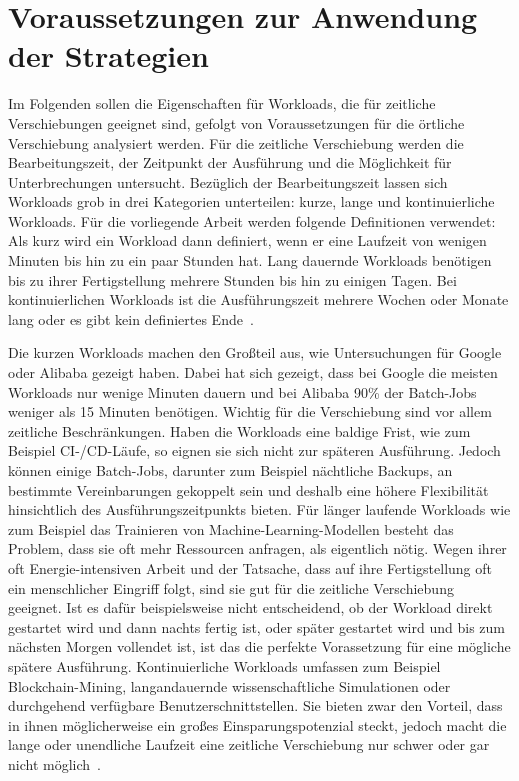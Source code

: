\section{Voraussetzungen zur Anwendung der Strategien}\label{CAP:requirements}
Im Folgenden sollen die Eigenschaften für Workloads, die für zeitliche Verschiebungen geeignet sind, gefolgt von Voraussetzungen für die örtliche Verschiebung analysiert werden.
Für die zeitliche Verschiebung werden die Bearbeitungszeit, der Zeitpunkt der Ausführung und die Möglichkeit für Unterbrechungen untersucht.
Bezüglich der Bearbeitungszeit lassen sich Workloads grob in drei Kategorien unterteilen: kurze, lange und kontinuierliche Workloads.
Für die vorliegende Arbeit werden folgende Definitionen verwendet:
Als kurz wird ein Workload dann definiert, wenn er eine Laufzeit von wenigen Minuten bis hin zu ein paar Stunden hat.
Lang dauernde Workloads benötigen bis zu ihrer Fertigstellung mehrere Stunden bis hin zu einigen Tagen.
Bei kontinuierlichen Workloads ist die Ausführungszeit mehrere Wochen oder Monate lang oder es gibt kein definiertes Ende~\cite{Wiesner.2021}.

Die kurzen Workloads machen den Großteil aus, wie Untersuchungen für Google oder Alibaba gezeigt haben.
Dabei hat sich gezeigt, dass bei Google die meisten Workloads nur wenige Minuten dauern und bei Alibaba 90\% der Batch-Jobs weniger als 15 Minuten benötigen.
Wichtig für die Verschiebung sind vor allem zeitliche Beschränkungen.
Haben die Workloads eine baldige Frist, wie zum Beispiel CI-/CD-Läufe, so eignen sie sich nicht zur späteren Ausführung.
Jedoch können einige Batch-Jobs, darunter zum Beispiel nächtliche Backups, an bestimmte Vereinbarungen gekoppelt sein und deshalb eine höhere Flexibilität hinsichtlich des Ausführungszeitpunkts bieten.
Für länger laufende Workloads wie zum Beispiel das Trainieren von Machine-Learning-Modellen besteht das Problem, dass sie oft mehr Ressourcen anfragen, als eigentlich nötig.
Wegen ihrer oft Energie-intensiven Arbeit und der Tatsache, dass auf ihre Fertigstellung oft ein menschlicher Eingriff folgt, sind sie gut für die zeitliche Verschiebung geeignet.
Ist es dafür beispielsweise nicht entscheidend, ob der Workload direkt gestartet wird und dann nachts fertig ist, oder später gestartet wird und bis zum nächsten Morgen vollendet ist, ist das die perfekte Vorassetzung für eine mögliche spätere Ausführung.
Kontinuierliche Workloads umfassen zum Beispiel Blockchain-Mining, langandauernde wissenschaftliche Simulationen oder durchgehend verfügbare Benutzerschnittstellen.
Sie bieten zwar den Vorteil, dass in ihnen möglicherweise ein großes Einsparungspotenzial steckt, jedoch macht die lange oder unendliche Laufzeit eine zeitliche Verschiebung nur schwer oder gar nicht möglich~\cite{Wiesner.2021}.


